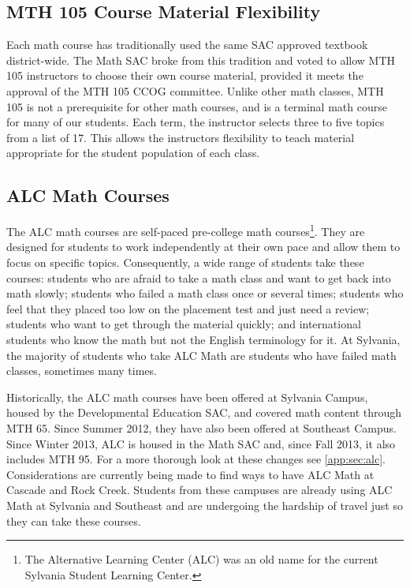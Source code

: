 \subsection{MTH 105 Course Material Flexibility}
Each math course has traditionally used the same SAC approved textbook
district-wide.  The Math SAC broke from this tradition and voted to allow MTH
105 instructors to choose their own course material, provided it meets the
approval of the MTH 105 CCOG committee.  Unlike other math classes, MTH 105 is not a
prerequisite for other math courses, and is a terminal math course for many
of our students.  Each term, the instructor selects three to five topics from a
list of 17.  This allows the instructors flexibility to teach material
appropriate for the student population of each class.

\subsection{ALC Math Courses}
The ALC math courses are self-paced pre-college math courses\footnote{The Alternative
Learning Center (ALC) was an old name for the current Sylvania Student Learning Center.}.
They are designed for students to work independently at their own pace and allow
them to focus on specific topics.  Consequently, a wide range of students take
these courses: students who are afraid to take a math class and want to get back
into math slowly; students who failed a math class once or several times; students
who feel that they placed too low on the placement test and just need a review;
students who want to get through the material quickly; and international
students who know the math but not the English terminology for it.  At Sylvania,
the majority of students who take ALC Math are students who have failed math classes,
sometimes many times.

Historically, the ALC math courses have been offered at Sylvania Campus, housed
by the Developmental Education SAC, and covered math content through MTH 65.
Since Summer 2012, they have also been offered at Southeast Campus.  Since
Winter 2013, ALC is housed in the Math SAC and, since Fall 2013, it also
includes MTH 95. For a more thorough look at these changes see
\vref{app:sec:alc}. Considerations are currently being made to find ways to have
ALC Math at Cascade and Rock Creek.  Students from these campuses are
already using ALC Math at Sylvania and Southeast and are undergoing the hardship
of travel just so they can take these courses.

